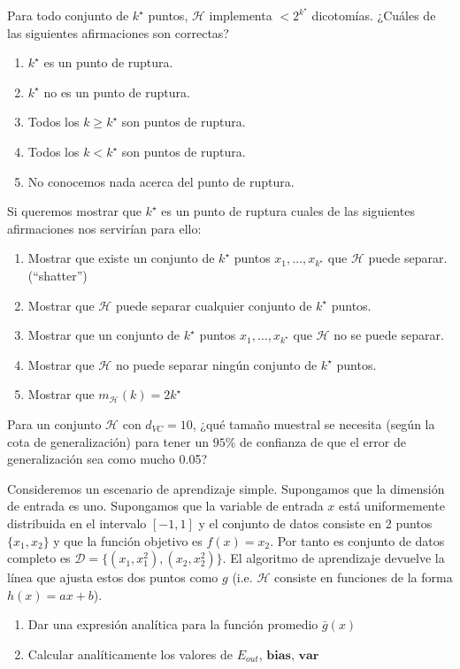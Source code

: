 \documentclass[11pt,leqno]{article}
\theoremstyle{definition}
\begin{document}
\begin{cuestion}
Para todo conjunto de $k^\star$ puntos, $\mathcal{H}$ implementa $<2^{k^\star}$ dicotomías. ¿Cuáles de las siguientes afirmaciones son correctas?

\begin{enumerate}[a]
\item  $k^\star$ es un punto de ruptura.
\item  $k^\star$ no es un punto de ruptura.
\item  Todos los $k \geq k^\star$ son puntos de ruptura.
\item  Todos los $k < k^\star$ son puntos de ruptura.
\item  No conocemos nada acerca del punto de ruptura.
\end{enumerate}
\end{cuestion}

\begin{cuestion}
Si queremos mostrar que $k^\star$ es un punto de ruptura cuales de las siguientes afirmaciones nos servirían para ello:

\begin{enumerate}[a]
\item Mostrar que existe un conjunto de $k^\star$ puntos $x_1,  \dots, x_{k^\star}$ que $\mathcal{H}$ puede separar. (``shatter'')
\item Mostrar que  $\mathcal{H}$ puede separar cualquier conjunto de $k^\star$ puntos.
\item Mostrar que un conjunto de $k^\star$ puntos $x_1,  \dots, x_{k^\star}$ que $\mathcal{H}$ no se puede separar.
\item Mostrar que $\mathcal{H}$ no puede separar ningún conjunto de $k^\star$ puntos.
\item Mostrar que $m_{\mathcal{H}}(k)=2k^\star$
\end{enumerate}
\end{cuestion}

\begin{cuestion}
Para un conjunto $\mathcal{H}$ con $d_{VC} = 10$, ¿qué tamaño muestral se necesita (según la cota de generalización) para tener un $95\%$ de confianza de que el error de generalización sea como mucho 0.05?
\end{cuestion}

\begin{cuestion}
Consideremos un escenario de aprendizaje simple. Supongamos que la dimensión de entrada es uno. Supongamos que la variable de entrada $x$ está uniformemente distribuida en el intervalo $[-1, 1]$ y el conjunto de datos consiste en 2 puntos $\{x_1, x_2\}$ y que la función objetivo es $f(x) = x_2$. Por tanto es conjunto de datos completo es $\mathcal{D} = \{(x_1, x^2_1), (x_2 , x_2^2)\}$. El algoritmo de aprendizaje devuelve la línea que ajusta estos dos puntos como $g$ (i.e. $\mathcal{H}$ consiste en funciones de la forma $h(x) = ax + b$).
\begin{enumerate}[a]
\item Dar una expresión analítica para la función promedio $\bar{g}(x)$
\item Calcular analíticamente los valores de $E_{out}$, $\textbf{bias}$, $\textbf{var}$
\end{enumerate}
\end{cuestion}
\end{document}
